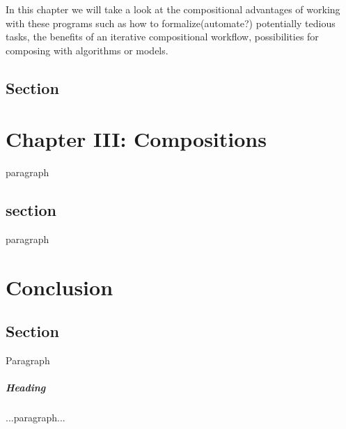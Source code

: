 \documentclass{tufte-book}
\begin{document}
In this chapter we will take a look at the compositional advantages of working with these programs such as how to formalize(automate?) potentially tedious tasks, the benefits of an iterative compositional workflow, possibilities for composing with algorithms or models.

\section{Section}
\label{sec:label}

\chapter{Chapter III: Compositions}
\label{ch:compositions}

paragraph

\section{section}

paragraph

\chapter{Conclusion}
\label{ch:conclusion}
\section{Section}
Paragraph

\paragraph{Heading}
...paragraph...









\backmatter





\printindex
\end{document}
